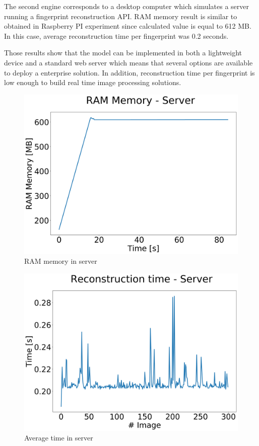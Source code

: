 \documentclass[a4paper,fleqn]{cas-dc}
\begin{document}
The second engine corresponds to a desktop computer which simulates a server running a fingerprint reconstruction API. RAM memory result is similar to obtained in Raspberry PI experiment since calculated value is equal to 612 MB. In this case, average reconstruction time per fingerprint was 0.2 seconds.

Those results show that the model can be implemented in both a lightweight device and a standard web server which means that several options are available to deploy a enterprise solution. In addition, reconstruction time per fingerprint is low enough to build real time image processing solutions.

\begin{figure}[htbp]
\centerline{\includegraphics[scale=0.22]{figs/RAM Server.png}}
\caption{RAM memory in server}
\label{fig11}
\end{figure}

\begin{figure}[htbp]
\centerline{\includegraphics[scale=0.22]{figs/Time Server.png}}
\caption{Average time in server}
\label{fig11}
\end{figure}
\end{document}
